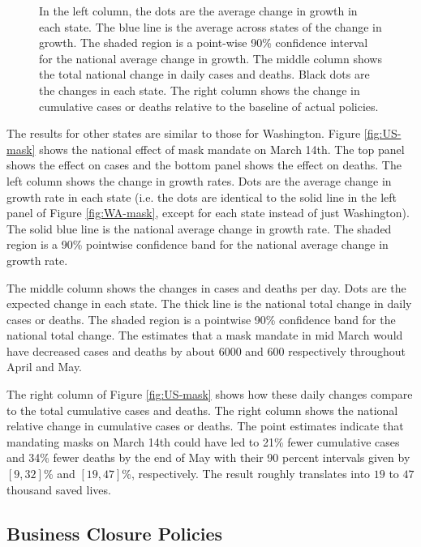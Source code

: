 \documentclass[11pt,reqno,letter]{amsart}
\theoremstyle{definition}
\begin{document}
\begin{figure}[ht]
\begin{minipage}{\linewidth}
    \begin{flushleft}
      \footnotesize In the left column, the dots are the average
      change in growth in each state. The blue line is the average
      across states of the change in growth. The shaded region is a
      point-wise 90\% confidence interval for the national average
      change in growth.  The middle column shows the total national
      change in daily cases and deaths. Black dots are the changes in each
      state.  The right column shows the change in cumulative cases or
      deaths relative to the baseline of actual policies.
    \end{flushleft}
  \end{minipage}
\end{figure}


The results for other states are similar to those for Washington.
Figure \ref{fig:US-mask} shows the national effect of mask mandate on
March 14th. The top panel shows the effect on cases and the bottom
panel shows the effect on deaths. The left column shows the change in
growth rates. Dots are the average change in growth rate in each state
(i.e. the dots are identical to the solid line in the left panel of
Figure \ref{fig:WA-mask}, except for each state instead of just
Washington). The solid blue line is the national average change in growth
rate. The shaded region is a 90\% pointwise confidence band for the
national average change in growth rate.

The middle column shows the changes in cases and deaths per day. Dots
are the expected change in each state. The thick line is the national
total change in daily cases or deaths. The shaded region is a
pointwise 90\% confidence band for the national total change. The
estimates that a mask mandate in mid March would have decreased cases
and deaths by about 6000 and 600 respectively throughout April and
May.

The right column of Figure \ref{fig:US-mask} shows how these daily
changes compare to the total cumulative cases and deaths. The right
column shows the national relative change in cumulative cases
or deaths. The point estimates indicate that mandating masks on March
14th could have led to 21\% fewer cumulative cases and 34\% fewer
deaths by the end of May with their 90 percent intervals
given by $[9,32]$\% and $[19,47]$\%, respectively.
The result roughly translates into $19$ to $47$ thousand saved lives.

\subsection{Business Closure Policies}
\end{document}
